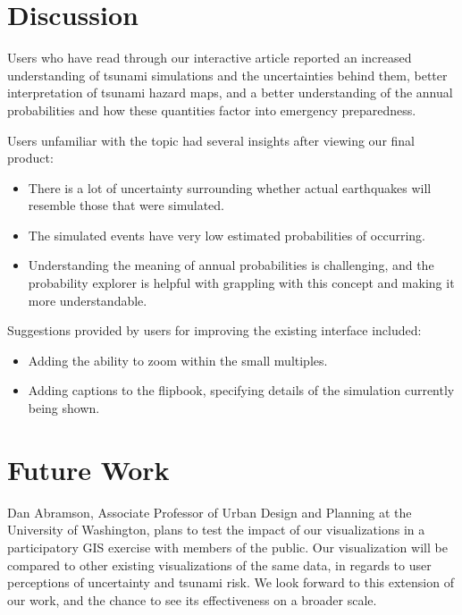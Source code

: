 \documentclass{vgtc}                          %
\begin{document}
\section{Discussion}\label{sec:discussion}

Users who have read through our interactive article reported an increased understanding of tsunami simulations and the uncertainties behind them, better interpretation of tsunami hazard maps, and a better understanding of the annual probabilities and how these quantities factor into emergency preparedness.

Users unfamiliar with the topic had several insights after viewing our final product:
\begin{itemize}
    \item There is a lot of uncertainty surrounding whether actual earthquakes will resemble those that were simulated. 
    \item The simulated events have very low estimated probabilities of occurring. %
    \item Understanding the meaning of annual probabilities is challenging, and the probability explorer is helpful with grappling with this concept and making it more understandable.
\end{itemize}

Suggestions provided by users for improving the existing interface included:
\begin{itemize}
    \item Adding the ability to zoom within the small multiples.
    \item Adding captions to the flipbook, specifying details of the simulation currently being shown.
\end{itemize}


\section{Future Work}\label{sec:future-work}

Dan Abramson, Associate Professor of Urban Design and Planning at the University of Washington, plans to test the impact of our visualizations in a participatory GIS exercise with members of the public. Our visualization will be compared to other existing visualizations of the same data, in regards to user perceptions of uncertainty and tsunami risk. We look forward to this extension of our work, and the chance to see its effectiveness on a broader scale.
\end{document}
